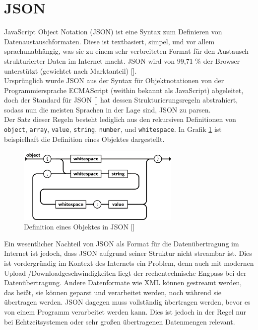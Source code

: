 \section{JSON}
\label{sec:json}

JavaScript Object Notation (JSON) ist eine Syntax zum Definieren von Datenaustauschformaten. Diese ist textbasiert, simpel, und vor allem sprachunabhängig, was sie zu einem sehr verbreiteten Format für den Austausch strukturierter Daten im Internet macht. JSON wird von 99,71 \% der Browser unterstützt (gewichtet nach Marktanteil) [\cite{jsonBrowser}].\\
Ursprünglich wurde JSON aus der Syntax für Objektnotationen von der Programmiersprache ECMAScript (weithin bekannt als JavaScript) abgeleitet, doch der Standard für JSON [\cite{json}] hat dessen Strukturierungsregeln abstrahiert, sodass nun die meisten Sprachen in der Lage sind, JSON zu parsen.\\
Der Satz dieser Regeln besteht lediglich aus den rekursiven Definitionen von \verb|object|, \verb|array|, \verb|value|, \verb|string|, \verb|number|, und \verb|whitespace|. In Grafik \ref{fig:JSON} ist beispielhaft die Definition eines Objektes dargestellt.
%
\begin{figure}[htbp]
	\centering\includegraphics[width=0.7\textwidth]{images/03/JSON.png}
    \caption{Definition eines Objektes in JSON [\cite{jsonDefinition}]}
    \label{fig:JSON}
\end{figure}

Ein wesentlicher Nachteil von JSON als Format für die Datenübertragung im Internet ist jedoch, dass JSON aufgrund seiner Struktur nicht streambar ist. Dies ist vordergründig im Kontext des Internets ein Problem, denn auch mit modernen Upload-/Downloadgeschwindigkeiten liegt der rechentechnische Engpass bei der Datenübertragung. Andere Datenformate wie XML können gestreamt werden, das heißt, sie können geparst und verarbeitet werden, noch während sie übertragen werden. JSON dagegen muss vollständig übertragen werden, bevor es von einem Programm verarbeitet werden kann. Dies ist jedoch in der Regel nur bei Echtzeitsystemen oder sehr großen übertragenen Datenmengen relevant.
